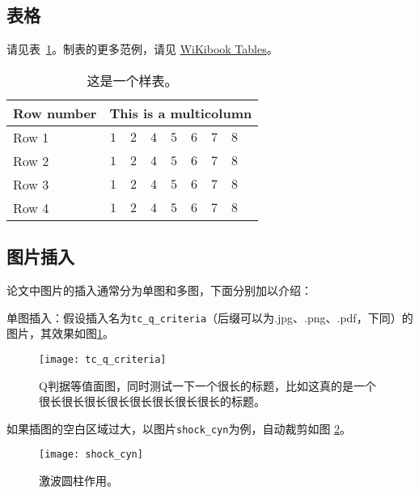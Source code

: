 \subsection{表格}

请见表~\ref{tab:sample}。制表的更多范例，请见
\href{https://en.wikibooks.org/wiki/LaTeX/Tables}{WiKibook Tables}。
\begin{table}[!htbp]
    \caption{这是一个样表。}
    \label{tab:sample}
    \centering
    \footnotesize%
    \setlength{\tabcolsep}{4pt}%
    \renewcommand{\arraystretch}{1.2}%
    \begin{tabular}{lcccccccc}
        \hline
        Row number & \multicolumn{8}{c}{This is a multicolumn} \\
        \hline
        Row 1 & $1$ & $2$ & $4$ & $5$ & $6$ & $7$ & $8$\\
        Row 2 & $1$ & $2$ & $4$ & $5$ & $6$ & $7$ & $8$\\
        Row 3 & $1$ & $2$ & $4$ & $5$ & $6$ & $7$ & $8$\\
        Row 4 & $1$ & $2$ & $4$ & $5$ & $6$ & $7$ & $8$\\
        \hline
    \end{tabular}
\end{table}

\subsection{图片插入}

论文中图片的插入通常分为单图和多图，下面分别加以介绍：

单图插入：假设插入名为\verb|tc_q_criteria|（后缀可以为.jpg、.png、.pdf，下同）的
图片，其效果如图\ref{fig:tc_q_criteria}。
\begin{figure}[!htbp]
    \centering
    \texttt{[image: tc\_q\_criteria]}
    \caption{Q判据等值面图，同时测试一下一个很长的标题，比如这真的是一个很长很长很长很长很长很长很长很长的标题。}
    \label{fig:tc_q_criteria}
\end{figure}

如果插图的空白区域过大，以图片\verb|shock_cyn|为例，自动裁剪如图
\ref{fig:shock_cyn}。
\begin{figure}[!htbp]
    \centering
    \texttt{[image: shock\_cyn]}
    \caption{激波圆柱作用。}
    \label{fig:shock_cyn}
\end{figure}

